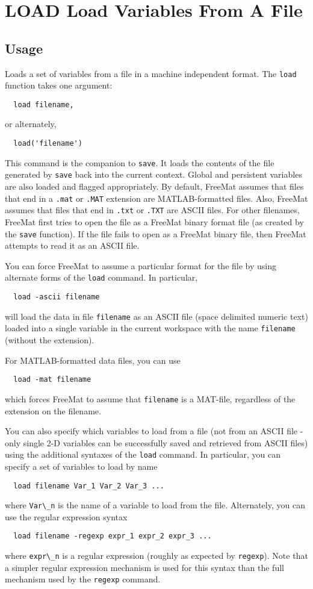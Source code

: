 \section{LOAD Load Variables From A File}

\subsection{Usage}

Loads a set of variables from a file in a machine independent format.
The \verb|load| function takes one argument:
\begin{verbatim}
  load filename,
\end{verbatim}
or alternately,
\begin{verbatim}
  load('filename')
\end{verbatim}
This command is the companion to \verb|save|.  It loads the contents of the
file generated by \verb|save| back into the current context.  Global and 
persistent variables are also loaded and flagged appropriately.  By
default, FreeMat assumes that files that end in a \verb|.mat| or \verb|.MAT|
extension are MATLAB-formatted files.  Also, FreeMat assumes that 
files that end in \verb|.txt| or \verb|.TXT| are ASCII files. 
For other filenames, FreeMat first tries to open the file as a 
FreeMat binary format file (as created by the \verb|save| function).  
If the file fails to open as a FreeMat binary file, then FreeMat 
attempts to read it as an ASCII file.  

You can force FreeMat to assume a particular format for the file
by using alternate forms of the \verb|load| command.  In particular,
\begin{verbatim}
  load -ascii filename
\end{verbatim}
will load the data in file \verb|filename| as an ASCII file (space delimited
numeric text) loaded into a single variable in the current workspace
with the name \verb|filename| (without the extension).

For MATLAB-formatted data files, you can use
\begin{verbatim}
  load -mat filename
\end{verbatim}
which forces FreeMat to assume that \verb|filename| is a MAT-file, regardless
of the extension on the filename.

You can also specify which variables to load from a file (not from 
an ASCII file - only single 2-D variables can be successfully saved and
retrieved from ASCII files) using the additional syntaxes of the \verb|load|
command.  In particular, you can specify a set of variables to load by name
\begin{verbatim}
  load filename Var_1 Var_2 Var_3 ...
\end{verbatim}
where \verb|Var\_n| is the name of a variable to load from the file.  
Alternately, you can use the regular expression syntax
\begin{verbatim}
  load filename -regexp expr_1 expr_2 expr_3 ...
\end{verbatim}
where \verb|expr\_n| is a regular expression (roughly as expected by \verb|regexp|).
Note that a simpler regular expression mechanism is used for this syntax
than the full mechanism used by the \verb|regexp| command.

